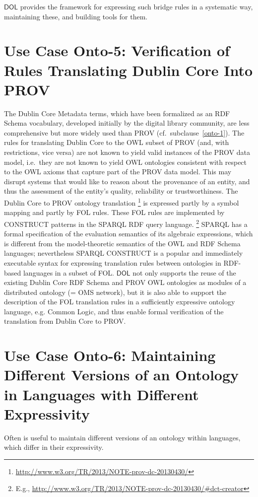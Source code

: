 \documentclass[10pt,fleqn,final]{scrreprt}
\newcommand*{\DOL}{\ensuremath{\mathsf{DOL}}\xspace}
\newenvironment{definitions}[0]{\medskip }{}
\begin{document}
\begin{definitions}
\DOL  provides the framework for expressing such bridge rules in a systematic way, maintaining these, and building tools for them. 


\section{Use Case Onto-5: Verification of Rules Translating Dublin Core Into PROV}
The Dublin Core Metadata terms, which have been formalized as an RDF Schema vocabulary, developed initially by the digital library community, are less 
comprehensive but more widely used than PROV (cf.\ subclause~\ref{onto-1}). The rules for translating Dublin Core to the OWL subset of PROV (and, with restrictions, 
vice versa) are not known to yield valid instances of the PROV data model, i.e.\ they are not known to yield OWL ontologies consistent with respect to the OWL axioms that 
capture part of the PROV data model. This may disrupt systems that would like to reason about the provenance of an entity, and thus the assessment of the 
entity's quality, reliability or trustworthiness.
The Dublin Core to PROV ontology translation%
\footnote{\url{http://www.w3.org/TR/2013/NOTE-prov-dc-20130430/}}
  is expressed partly by a symbol mapping and partly by FOL rules. These FOL rules are implemented by CONSTRUCT patterns in the SPARQL RDF query language.%
\footnote{E.g., \url{http://www.w3.org/TR/2013/NOTE-prov-dc-20130430/\#dct-creator}} 
SPARQL has a formal specification of the evaluation semantics of its algebraic expressions, which 
 is different from the model-theoretic semantics of the OWL and RDF Schema languages; nevertheless 
SPARQL CONSTRUCT is a popular and immediately executable syntax for expressing translation rules 
 between ontologies in RDF-based languages in a subset of FOL.
\DOL  not only supports the reuse of the existing Dublin Core RDF Schema and PROV OWL ontologies as 
 modules of a distributed ontology (= OMS network), but it is also able to support the description 
of the FOL translation rules in a sufficiently expressive ontology language, e.g. Common Logic, 
and thus enable formal verification of the translation from Dublin Core to PROV.



\section{Use Case Onto-6: Maintaining Different Versions of an Ontology 
in Languages with Different Expressivity}
Often is useful to maintain different versions of an ontology within languages, which differ in 
 their expressivity. 
 

\end{definitions}
\end{document}

